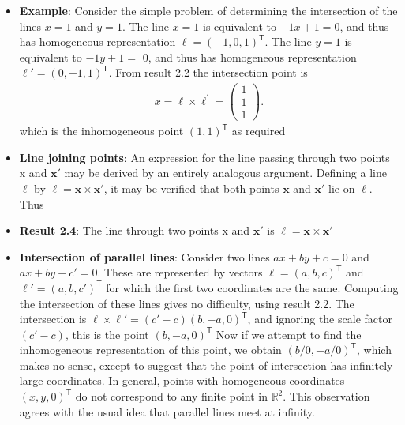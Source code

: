\documentclass{report}
\begin{document}
\begin{itemize}
            Note that the simplicity of this expression for the intersection of the two lines is a direct consequence of the use of homogeneous vector representations of lines and points.
        \item \textbf{Example}: Consider the simple problem of determining the intersection of the lines $x=1$ and $y=1$. The line $x=1$ is equivalent to $-1x+1=0$, and thus has homogeneous representation $\mathbf{\ell}=(-1, 0, 1)^{\mathsf{T}}$. The line $y=1$ is equivalent to $-1y+1=$ 0, and thus has homogeneous representation $\ell'=(0, -1, 1)^{\mathsf{T}}$. From result 2.2 the intersection point is
            \begin{align*}
                x = \mathbf{\ell} \times \ell^{\prime} = \begin{pmatrix} 1 \\ 1 \\ 1 \end{pmatrix}
            .\end{align*}
            which is the inhomogeneous point $(1, 1)^{\mathsf{T}}$ as required
        \item \textbf{Line joining points}:  An expression for the line passing through two points x and $\mathbf{x}'$ may be derived by an entirely analogous argument. Defining a line $\ell$ by $\mathbf{\ell}=\mathbf{x}\times \mathbf{x}'$, it may be verified that both points $\mathbf{x}$ and $\mathbf{x}'$ lie on $\ell$. Thus
        \item \textbf{Result 2.4}: The line through two points x and $\mathbf{x}'$ is $\mathbf{\ell}=\mathbf{x}\times \mathbf{x}'$
        \item \textbf{Intersection of parallel lines}: Consider two lines $ax+by+c=0$ and $ax+by+c'=0$. These are represented by vectors $\mathbf{\ell}=(a, b, c)^{\mathsf{T}}$ and $\ell'=(a, b, c')^{\mathsf{T}}$ for which the first two coordinates are the same. Computing the intersection of these lines gives no difficulty, using result 2.2. The intersection is $\ell\times \ell'=(c'-c)(b, -a, 0)^{\mathsf{T}}$, and ignoring the scale factor $(c'-c)$, this is the point $(b, -a, 0)^{\mathsf{T}}$
            \bigbreak \noindent 
            Now if we attempt to find the inhomogeneous representation of this point, we obtain $(b/0, -a/0)^{\mathsf{T}}$, which makes no sense, except to suggest that the point of intersection has infinitely large coordinates. In general, points with homogeneous coordinates $(x, y, 0)^{\mathsf{T}}$ do not correspond to any finite point in $\mathbb{R}^{2}$. This observation agrees with the usual idea that parallel lines meet at infinity.

\end{itemize}
\end{document}
